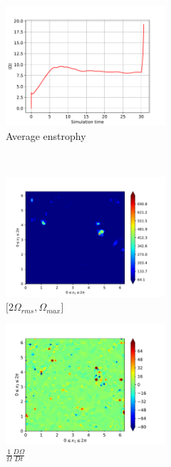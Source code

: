 \begin{figure}[H]
    \begin{subfigure}[H]{0.45\textwidth}
        \includegraphics[height=1.75in]{media/run-cds-65/enst-average1380}
        \caption{Average enstrophy}
    \end{subfigure}
    ~
    \begin{subfigure}[H]{0.45\textwidth}
        \includegraphics[height=1.75in]{media/run-cds-65/enst-2-1380}
        \caption{$[2\Omega_{rms}, \Omega_{max} $] }
    \end{subfigure}
    \newline
    \begin{subfigure}[H]{0.45\textwidth}
        \includegraphics[height=1.75in]{media/run-cds-65/enst-1380}
        \caption{$\frac{1}{\Omega} \frac{D \Omega}{Dt}$}
    \end{subfigure}
    ~
    \begin{subfigure}{0.45\textwidth}

\end{subfigure}
\end{figure}
